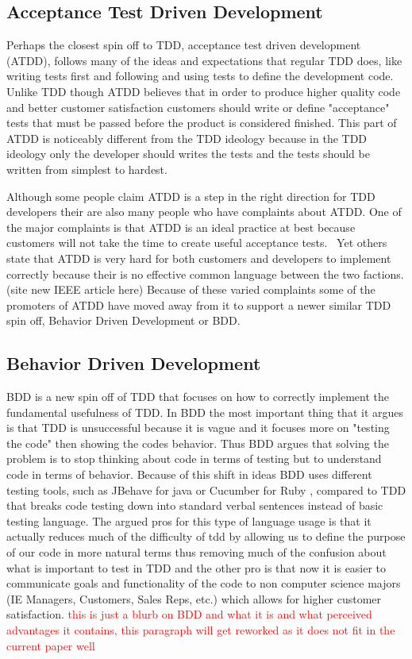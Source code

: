 \documentclass{sig-alternate}
\newcommand{\mycomment}[1]{\textcolor{red}{#1}}
\begin{document}
\subsection{Acceptance Test Driven Development}

Perhaps the closest spin off to TDD, acceptance test driven development (ATDD), follows many of the ideas and expectations that regular TDD does, like writing tests first and following and using tests to define the development code.  Unlike TDD though ATDD believes that in order to produce higher quality code and better customer satisfaction customers should write or define "acceptance" tests that must be passed before the product is considered finished.  This part of ATDD is noticeably different from the TDD ideology because in the TDD ideology only the developer should writes the tests and the tests should be written from simplest to hardest.~\cite{Hammond:2012}

Although some people claim ATDD is a step in the right direction for TDD developers their are also many people who have complaints about ATDD.  One of the major complaints is that ATDD is an ideal practice at best because customers will not take the time to create useful acceptance tests.~\cite{Hammond:2012} Yet others state that ATDD is very hard for both customers and developers to implement correctly because their is no effective common language between the two factions.(site new IEEE article here)  Because of these varied complaints some of the promoters of ATDD have moved away from it to support a newer similar TDD spin off, Behavior Driven Development or BDD.

\subsection{Behavior Driven Development}
BDD is a new spin off of TDD that focuses on how to correctly implement the fundamental usefulness of TDD.  In BDD the most important thing that it argues is that TDD is unsuccessful because it is vague and it focuses more on "testing the code" then showing the codes behavior.  Thus BDD argues that solving the problem is to stop thinking about code in terms of testing but to understand code in terms of behavior.  Because of this shift in ideas BDD uses different testing tools, such as JBehave for java or Cucumber for Ruby \cite{Soeken:2012}, compared to TDD that breaks code testing down into standard verbal sentences instead of basic testing language.  The argued pros for this type of language usage is that it actually reduces much of the difficulty of tdd by allowing us to define the purpose of our code in more natural terms thus removing much of the confusion about what is important to test in TDD and the other pro is that now it is easier to communicate goals and functionality of the code to non computer science majors (IE Managers, Customers, Sales Reps, etc.) which allows for higher customer satisfaction.
\mycomment{this is just a blurb on BDD and what it is and what perceived advantages it contains, this paragraph will get reworked as it does not fit in the current paper well}
\end{document}
